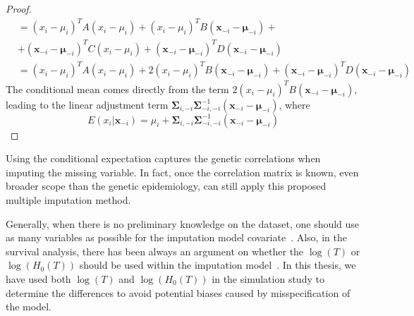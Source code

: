 \begin{proof}
\begin{align*}
        &= (x_i - \mu_i)^T A (x_i - \mu_i) + (x_i - \mu_i)^T B (\mathbf{x}_{-i} - \boldsymbol{\mu}_{-i}) + \\
        &+(\mathbf{x}_{-i} - \boldsymbol{\mu}_{-i})^T C (x_i - \mu_i) + (\mathbf{x}_{-i} - \boldsymbol{\mu}_{-i})^T D (\mathbf{x}_{-i} - \boldsymbol{\mu}_{-i}) \\
        &= (x_i - \mu_i)^T A (x_i - \mu_i) + 2 (x_i - \mu_i)^T B (\mathbf{x}_{-i} - \boldsymbol{\mu}_{-i}) + (\mathbf{x}_{-i} - \boldsymbol{\mu}_{-i})^T D (\mathbf{x}_{-i} - \boldsymbol{\mu}_{-i})
    \end{align*}
    The conditional mean comes directly from the term \( 2 (x_i - \mu_i)^T B (\mathbf{x}_{-i} - \boldsymbol{\mu}_{-i}) \), leading to the linear adjustment term \(\boldsymbol{\Sigma}_{i,-i} \boldsymbol{\Sigma}_{-i,-i}^{-1} (\mathbf{x}_{-i} - \boldsymbol{\mu}_{-i})\), where
    \begin{equation*}
        E(x_i|\mathbf{x}_{-i})=\mu_i+\boldsymbol{\Sigma}_{i,-i}\boldsymbol{\Sigma}_{-i,-i}^{-1}(\mathbf{x}_{-i}-\boldsymbol{\mu}_{-i})
    \end{equation*}
\end{proof}
Using the conditional expectation captures the genetic correlations when imputing the missing variable. 
In fact, once the correlation matrix is known, even broader scope than the genetic epidemiology, can still apply this proposed multiple imputation method.

Generally, when there is no preliminary knowledge on the dataset, one should use as many variables as possible for the imputation model covariate~\cite{rubin2018multiple}.
Also, in the survival analysis, there has been always an argument on whether the $\log(T)$ or $\log(H_0(T))$ should be used within the imputation model~\cite{white2009imputing}. 
In this thesis, we have used both $\log(T)$ and $\log(H_0(T))$ in the simulation study to determine the differences to avoid potential biases caused by misspecification of the model. 

